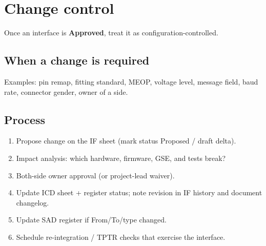 \section{Change control}

Once an interface is \textbf{Approved}, treat it as configuration-controlled.

\subsection{When a change is required}

Examples: pin remap, fitting standard, MEOP, voltage level, message field,
baud rate, connector gender, owner of a side.

\subsection{Process}

\begin{enumerate}
  \item Propose change on the IF sheet (mark status Proposed / draft delta).
  \item Impact analysis: which hardware, firmware, GSE, and tests break?
  \item Both-side owner approval (or project-lead waiver).
  \item Update ICD sheet + register status; note revision in IF history and
    document changelog.
  \item Update SAD register if From/To/type changed.
  \item Schedule re-integration / TPTR checks that exercise the interface.
\end{enumerate}

